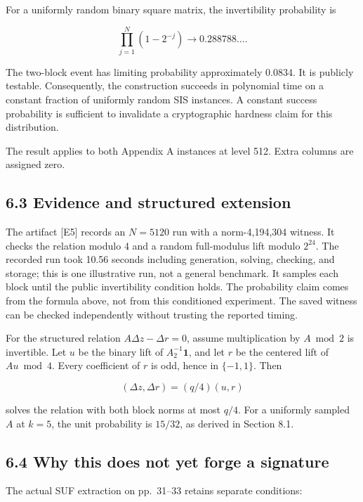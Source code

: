 \documentclass[
  american,
  10pt,
  a4paper,
]{article}
\begin{document}
For a uniformly random binary square matrix, the invertibility
probability is

\[
\prod_{j=1}^{N}(1-2^{-j})\longrightarrow 0.288788\ldots.
\]

The two-block event has limiting probability approximately 0.0834. It is
publicly testable. Consequently, the construction succeeds in polynomial
time on a constant fraction of uniformly random SIS instances. A
constant success probability is sufficient to invalidate a cryptographic
hardness claim for this distribution.

The result applies to both Appendix A instances at level 512. Extra
columns are assigned zero.

\subsection{6.3 Evidence and structured
extension}\label{evidence-and-structured-extension}

The artifact {[}E5{]} records an \(N=5120\) run with a norm-4,194,304
witness. It checks the relation modulo 4 and a random full-modulus lift
modulo \(2^{24}\). The recorded run took 10.56 seconds including
generation, solving, checking, and storage; this is one illustrative
run, not a general benchmark. It samples each block until the public
invertibility condition holds. The probability claim comes from the
formula above, not from this conditioned experiment. The saved witness
can be checked independently without trusting the reported timing.

For the structured relation \(A\Delta z-\Delta r=0\), assume
multiplication by \(A\bmod2\) is invertible. Let \(u\) be the binary
lift of \(A_2^{-1}\mathbf1\), and let \(r\) be the centered lift of
\(Au\bmod4\). Every coefficient of \(r\) is odd, hence in \(\{-1,1\}\).
Then

\[
(\Delta z,\Delta r)=(q/4)(u,r)
\]

solves the relation with both block norms at most \(q/4\). For a
uniformly sampled \(A\) at \(k=5\), the unit probability is \(15/32\),
as derived in Section 8.1.

\subsection{6.4 Why this does not yet forge a
signature}\label{why-this-does-not-yet-forge-a-signature}

The actual SUF extraction on pp.~31--33 retains separate conditions:
\end{document}
